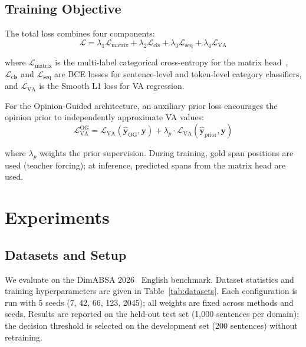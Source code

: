 \documentclass[runningheads]{llncs}
\begin{document}
\subsection{Training Objective}
\label{sec:training}

The total loss combines four components:
\begin{equation}
    \mathcal{L} = \lambda_1 \mathcal{L}_{\text{matrix}} + \lambda_2 \mathcal{L}_{\text{cls}} + \lambda_3 \mathcal{L}_{\text{seq}} + \lambda_4 \mathcal{L}_{\text{VA}}
    \label{eq:loss}
\end{equation}

where $\mathcal{L}_{\text{matrix}}$ is the multi-label categorical cross-entropy for the matrix head~\cite{su2022globalpointer}, $\mathcal{L}_{\text{cls}}$ and $\mathcal{L}_{\text{seq}}$ are BCE losses for sentence-level and token-level category classifiers, and $\mathcal{L}_{\text{VA}}$ is the Smooth L1 loss for VA regression.

For the Opinion-Guided architecture, an auxiliary prior loss encourages the opinion prior to independently approximate VA values:
\begin{equation}
    \mathcal{L}_{\text{VA}}^{\text{OG}} = \mathcal{L}_{\text{VA}}(\hat{\mathbf{y}}_{\text{OG}}, \mathbf{y}) + \lambda_p \cdot \mathcal{L}_{\text{VA}}(\hat{\mathbf{y}}_{\text{prior}}, \mathbf{y})
    \label{eq:og_loss}
\end{equation}

where $\lambda_p$ weights the prior supervision. During training, gold span positions are used (teacher forcing); at inference, predicted spans from the matrix head are used.

\section{Experiments}
\label{sec:exp}

\subsection{Datasets and Setup}

We evaluate on the DimABSA 2026~\cite{dimabsa2026} English benchmark. Dataset statistics and training hyperparameters are given in Table~\ref{tab:datasets}. Each configuration is run with 5 seeds (7, 42, 66, 123, 2045); all weights are fixed across methods and seeds. Results are reported on the held-out test set (1,000 sentences per domain); the decision threshold is selected on the development set (200 sentences) without retraining.
\end{document}
